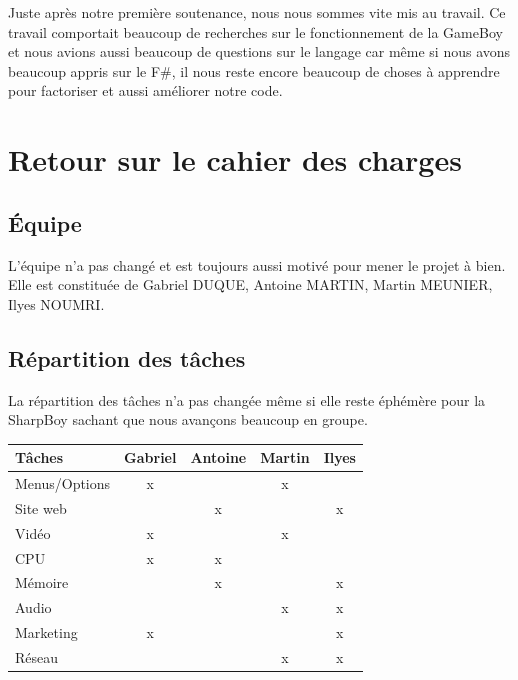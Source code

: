 \documentclass[12pt, a4paper]{article}
\begin{document}
Juste après notre première soutenance, nous nous sommes vite mis au travail. Ce travail comportait beaucoup de recherches sur le fonctionnement de la GameBoy et nous avions aussi beaucoup de questions sur le langage car même si nous avons beaucoup appris sur le F\#, il nous reste encore beaucoup de choses à apprendre pour factoriser et aussi améliorer notre code.

\pagebreak

\section{Retour sur le cahier des charges}
\subsection{Équipe}
L'équipe n'a pas changé et est toujours aussi motivé pour mener le projet à bien. Elle est constituée de Gabriel DUQUE, Antoine MARTIN, Martin MEUNIER, Ilyes NOUMRI.


\bigskip
\subsection{Répartition des tâches}
\bigskip

La répartition des tâches n'a pas changée même si elle reste éphémère pour la SharpBoy sachant que nous avançons beaucoup en groupe.
\bigskip


\begin{center}
\begin{tabular}{|l|c|c|c|c|}
\hline
\bf Tâches                & \bf Gabriel   & \bf Antoine   & \bf Martin    & \bf Ilyes\\
\hline 
Menus/Options       &      x       &               &         x     &       \\
\hline 
Site web            &               &         x     &               &     x  \\
\hline 
Vidéo               &          x    &               &       x       &       \\
\hline 
CPU                 & x             & x             &               &       \\
\hline 
Mémoire             &               & x             &               &  x \\
\hline
Audio               &               &               & x             & x \\
\hline
Marketing           & x             &               &               & x \\
\hline
Réseau              &               &               & x             & x \\ 
\hline
\end{tabular}
\end{center}
\bigskip
\pagebreak
\end{document}
